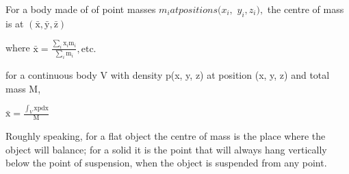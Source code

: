 For a body made of of point masses $m_{i} at positions (x_{i},$  $y_{i}, z_{i}),$  the centre of mass is at $ (\bar{\mathrm{x}},
 \bar{\mathrm{y}}, \bar{\mathrm{z}} ) $
\par
where $ \bar{\mathrm{x}} = \frac{\sum_i \mathrm{x}_i \mathrm{m}_i}{\sum_i \mathrm{m}_i},
\mathrm{  etc.} $
\par
for a continuous body V with density p(x, y, z) at position (x, y, z) and total mass
M,
\par
$ \bar{\mathrm{x}} = \frac{\int_V \mathrm{xpdx}}{\mathrm{M}} $
\par
Roughly speaking, for a flat object the centre of mass is the place where the object will
balance; for a solid it is the point that will always hang vertically below the point
of suspension, when the object is suspended from any point.
